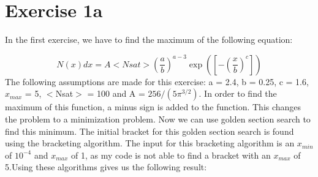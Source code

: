 \section{Exercise 1a}



In the first exercise, we have to find the maximum of the following equation: 

\begin{equation}
    N(x)dx = A <Nsat> \left( \frac{a}{b} \right)^{a-3} \exp(\left[ - \left( \frac{x}{b} \right)^c \right])
\end{equation}
The following  assumptions are made for this exercise: a = 2.4, b = 0.25, c = 1.6, $x_{max}$ = 5, $<$Nsat$>$ = 100 and A = $256/(5\pi^{3/2})$. In order to find the maximum of this function, a minus sign is added to the function. This changes the problem to a minimization problem. Now we can use golden section search to find this minimum. The initial bracket for this golden section search is found using the bracketing algorithm. The input for this bracketing algorithm is an $x_{min}$ of $10^{-4}$ and $x_{max}$ of 1, as my code is not able to find a bracket with an $x_{max}$ of 5.Using these algorithms gives us the following result: 
\\
\\


